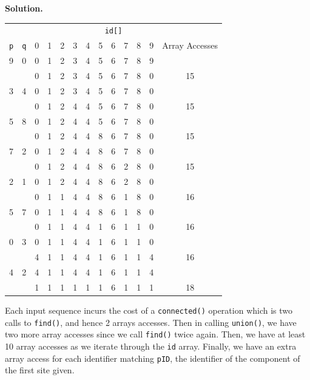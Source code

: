 \documentclass[12pt, a4paper]{article}
\newenvironment{sol}[1][Solution]
{\par\medskip\noindent \textbf{#1.} }
{\medskip}
\begin{document}
	\begin{sol}
		\begin{center}
			\begin{tabular}{cc|cccccccccc|c}
				\multicolumn{13}{c}{\texttt{id[]}}\\
				\texttt{p} & \texttt{q} & 0 & 1 & 2 & 3 & 4 & 5 & 6 & 7 & 8 & 9 & Array Accesses\\
				\hline
				9  & 0  & {\color{green} 0} & 1 & 2 & 3 & 4 & 5 & 6 & 7 & 8 & {\color{green} 9} & {}\\
				{} & {} & 0 & 1 & 2 & 3 & 4 & 5 & 6 & 7 & 8 & {\color{red} 0} & 15\\
				3  & 4  & 0 & 1 & 2 & {\color{green} 3} & {\color{green} 4} & 5 & 6 & 7 & 8 & 0 & {}\\
				{} & {} & 0 & 1 & 2 & {\color{red} 4} & 4 & 5 & 6 & 7 & 8 & 0 & 15\\
				5  & 8  & 0 & 1 & 2 & 4 & 4 & {\color{green} 5} & 6 & 7 & {\color{green} 8} & 0 & {}\\
				{} & {} & 0 & 1 & 2 & 4 & 4 & {\color{red} 8} & 6 & 7 & 8 & 0 & 15\\
				7  & 2  & 0 & 1 & {\color{green} 2} & 4 & 4 & 8 & 6 & {\color{green} 7} & 8 & 0 & {}\\
				{} & {} & 0 & 1 & 2 & 4 & 4 & 8 & 6 & {\color{red} 2} & 8 & 0 & 15\\
				2  & 1  & 0 & {\color{green} 1} & {\color{green} 2} & 4 & 4 & 8 & 6 & 2 & 8 & 0 & {}\\
				{} & {} & 0 & 1 & {\color{red} 1} & 4 & 4 & 8 & 6 & {\color{red} 1} & 8 & 0 & 16\\
				5  & 7  & 0 & 1 & 1 & 4 & 4 & {\color{green} 8} & 6 & {\color{green} 1} & 8 & 0 & {}\\
				{} & {} & 0 & 1 & 1 & 4 & 4 & {\color{red} 1} & 6 & 1 & {\color{red} 1} & 0 & 16\\
				0  & 3  & {\color{green} 0} & 1 & 1 & {\color{green} 4} & 4 & 1 & 6 &  1 & 1 & 0 & {} \\
				{} & {} & {\color{red} 4} & 1 & 1 & 4 & 4 & 1 & 6 &  1 & 1 & {\color{red} 4} & 16\\
				4  & 2  & 4 & 1 & {\color{green} 1} & 4 & {\color{green} 4} & 1 & 6 &  1 & 1 & 4 & \\
				{} & {} & {\color{red} 1} & 1 & 1 & {\color{red} 1} & {\color{red} 1} & 1 & 6 &  1 & 1 & {\color{red} 1} & 18\\
			\end{tabular}
		\end{center}
		Each input sequence incurs the cost of a \texttt{connected()} operation which is two
		calls to \texttt{find()}, and hence 2 arrays accesses. Then in calling \texttt{union()},
		we have two more array accesses since  we call \texttt{find()} twice again. Then,
		we have at least 10 array accesses as we iterate through the \texttt{id} array. Finally,
		we have an extra array access for each identifier matching \texttt{pID}, the identifier
		of the component of the first site given.
	\end{sol}
\end{document}
